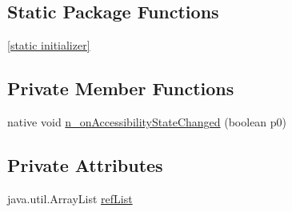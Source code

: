 \subsection*{Static Package Functions}
\begin{CompactItemize}
\item 
\hyperlink{classmono_1_1android_1_1support_1_1v4_1_1view_1_1accessibility_1_1_accessibility_manager_compat_18265d54b1862e339153b0dd9ae68d99_2f804cd8d2a599809abbf79cbb0cdb56}{\mbox{[}static initializer\mbox{]}}
\end{CompactItemize}
\subsection*{Private Member Functions}
\begin{CompactItemize}
\item 
native void \hyperlink{classmono_1_1android_1_1support_1_1v4_1_1view_1_1accessibility_1_1_accessibility_manager_compat_18265d54b1862e339153b0dd9ae68d99_ac45e11ed163785a4f87861e046a4e43}{n\_\-onAccessibilityStateChanged} (boolean p0)
\end{CompactItemize}
\subsection*{Private Attributes}
\begin{CompactItemize}
\item 
java.util.ArrayList \hyperlink{classmono_1_1android_1_1support_1_1v4_1_1view_1_1accessibility_1_1_accessibility_manager_compat_18265d54b1862e339153b0dd9ae68d99_3baa2427af2406275039d08f5a097d0d}{refList}
\end{CompactItemize}


